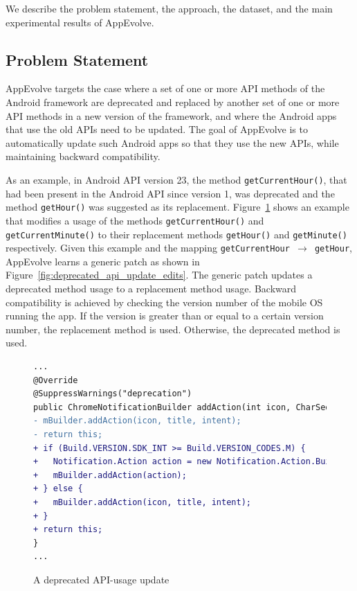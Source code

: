 We describe the problem statement, the approach, the dataset, and the main
experimental results of AppEvolve.

\subsection{Problem Statement}\label{sec:problem}

AppEvolve targets the case where a set of one or more API methods of the
Android framework are deprecated and replaced by another set of one or more
API methods in a new version of the framework, and where the Android apps
that use the old APIs need to be updated.  The goal of AppEvolve is to
automatically update such Android apps so that they use the new APIs, while
maintaining backward compatibility.


As an example, in Android API version 23, the method
{\tt get\-Current\-Hour()}, that had been present in the Android API since
version 1, was deprecated and the method \texttt{getHour()} was suggested
as its replacement.  Figure~\ref{fig:deprecated_api_update_example} shows
an example that modifies a usage of the methods \texttt{getCurrentHour()}
and \texttt{getCurrentMinute()} to their replacement methods
\texttt{getHour()} and \texttt{getMinute()} respectively.
Given this example and the mapping
\texttt{getCurrentHour $\rightarrow$ getHour}, AppEvolve learns a generic
patch as shown in Figure~\ref{fig:deprecated_api_update_edits}.
The generic patch updates a
deprecated method usage to a replacement method usage.  Backward
compatibility is achieved by checking the version number of the mobile OS
running the app. If the version is greater than or equal to a certain
version number, the replacement method is used. Otherwise, the deprecated
method is used.

\begin{figure}[htb]
\begin{lstlisting}[language=diff,numbers=none]
...
@Override
@SuppressWarnings("deprecation")
public ChromeNotificationBuilder addAction(int icon, CharSequence title, PendingIntent intent) {
- mBuilder.addAction(icon, title, intent);
- return this;
+ if (Build.VERSION.SDK_INT >= Build.VERSION_CODES.M) {
+   Notification.Action action = new Notification.Action.Builder(Icon.createWithResource(mContext, icon), title, intent).build();
+   mBuilder.addAction(action);
+ } else {
+   mBuilder.addAction(icon, title, intent);
+ }
+ return this;
}
...
\end{lstlisting}
\caption{A deprecated API-usage update}
\label{fig:deprecated_api_update_example}
\end{figure}

